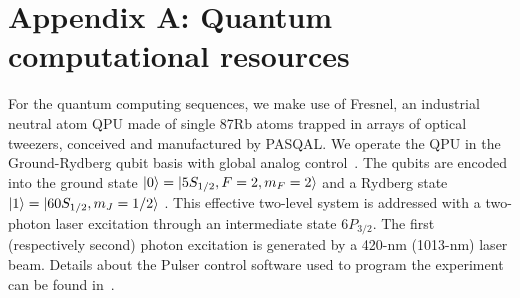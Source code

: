 \documentclass[fleqn,10pt]{wlscirep}
\begin{document}
%
%
%





%
%
%
%


%
%
%
%

\section*{Appendix A: Quantum computational resources}
For the quantum computing sequences, we make use of Fresnel, an industrial neutral atom QPU made of single 87Rb atoms trapped in arrays of optical tweezers, conceived and manufactured by PASQAL. We operate the QPU in the Ground-Rydberg qubit basis with global analog control~\cite{henriet2020quantum}. The qubits are encoded into the ground state $\ket{0} = \ket{5S_{1/2}, F = 2, m_F = 2}$ and a Rydberg state $\ket{1} = \ket{60S_{1/2}, m_J = 1/2}$ . This effective two-level system is addressed with a two-photon laser excitation through an intermediate state $6P_{3/2}$. The first (respectively second) photon excitation is generated by a 420-nm (1013-nm) laser beam. Details about the Pulser control software used to program the experiment can be found in~\cite{pulser}. 
\end{document}
